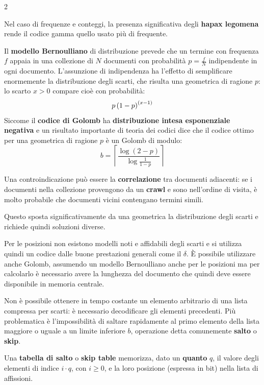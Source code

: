 \documentclass[\main/main.tex]{subfiles}
\begin{document}
\begin{multicols}{2}
\begin{observation}
    Nel caso di frequenze e conteggi, la presenza significativa degli \textbf{hapax legomena} rende il codice gamma quello usato più di frequente.
\end{observation}
\begin{observation}
    Il \textbf{modello Bernoulliano} di distribuzione prevede che un termine con frequenza \(f\) appaia in una collezione di \(N\) documenti con probabilità \(p = \frac{f}{N}\) indipendente in ogni documento. L'assunzione di indipendenza ha l'effetto di semplificare enormemente la distribuzione degli scarti, che risulta una geometrica di ragione \(p\): lo scarto \(x > 0\) compare cioè con probabilità:
    \[
        p\left(1-p\right)^{\left(x-1\right)}
    \]
    Siccome il \textbf{codice di Golomb} ha \textbf{distribuzione intesa esponenziale negativa} e un risultato importante di teoria dei codici dice che il codice ottimo per una geometrica di ragione \(p\) è un Golomb di modulo:
    \[
        b=\left\lceil\frac{\log (2-p)}{\log \frac{1}{1-p}}\right\rceil
    \]
\end{observation}
\begin{observation}
    Una controindicazione può essere la \textbf{correlazione} tra documenti adiacenti: se i documenti nella collezione provengono da un \textbf{crawl} e sono nell'ordine di visita, è molto probabile che documenti vicini contengano termini simili.
    
    Questo sposta significativamente da una geometrica la distribuzione degli scarti e richiede quindi soluzioni diverse.
\end{observation}
\begin{observation}
    Per le posizioni non esistono modelli noti e affidabili degli scarti e si utilizza quindi un codice dalle buone prestazioni generali come il \(\delta\). È possibile utilizzare anche Golomb, assumendo un modello Bernoulliano anche per le posizioni ma per calcolarlo è necessario avere la lunghezza del documento che quindi deve essere disponibile in memoria centrale.
\end{observation}
\begin{observation}
    Non è possibile ottenere in tempo costante un elemento arbitrario di una lista compressa per scarti: è necessario decodificare gli elementi precedenti. Più problematica è l'impossibilità di saltare rapidamente al primo elemento della lista maggiore o uguale a un limite inferiore \(b\), operazione detta comunemente \textbf{salto} o \textbf{skip}.
\end{observation}
\begin{definition}
    Una \textbf{tabella di salto} o \textbf{skip table} memorizza, dato un \textbf{quanto} \(q\), il valore degli elementi di indice \(i\cdot q\), con \(i\geq 0\), e la loro posizione (espressa in bit) nella lista di affissioni.
    

\end{definition}
\end{multicols}
\end{document}
